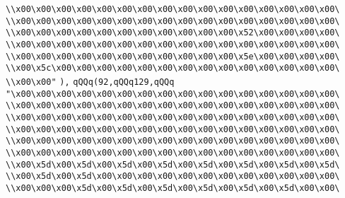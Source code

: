 \verb|\\x00\x00\x00\x00\x00\x00\x00\x00\x00\x00\x00\x00\x00\x00\x00\x00\|\newline
\verb|\\x00\x00\x00\x00\x00\x00\x00\x00\x00\x00\x00\x00\x00\x00\x00\x00\|\newline
\verb|\\x00\x00\x00\x00\x00\x00\x00\x00\x00\x00\x00\x52\x00\x00\x00\x00\|\newline
\verb|\\x00\x00\x00\x00\x00\x00\x00\x00\x00\x00\x00\x00\x00\x00\x00\x00\|\newline
\verb|\\x00\x00\x00\x00\x00\x00\x00\x00\x00\x00\x00\x5e\x00\x00\x00\x00\|\newline
\verb|\\x00\x5c\x00\x00\x00\x00\x00\x00\x00\x00\x00\x00\x00\x00\x00\x00\|\newline
\verb|\\x00\x00"|\newline
\verb|),|\newline
\verb|qQQq(92,qQQq129,qQQq|\newline
\verb|"\x00\x00\x00\x00\x00\x00\x00\x00\x00\x00\x00\x00\x00\x00\x00\x00\|\newline
\verb|\\x00\x00\x00\x00\x00\x00\x00\x00\x00\x00\x00\x00\x00\x00\x00\x00\|\newline
\verb|\\x00\x00\x00\x00\x00\x00\x00\x00\x00\x00\x00\x00\x00\x00\x00\x00\|\newline
\verb|\\x00\x00\x00\x00\x00\x00\x00\x00\x00\x00\x00\x00\x00\x00\x00\x00\|\newline
\verb|\\x00\x00\x00\x00\x00\x00\x00\x00\x00\x00\x00\x00\x00\x00\x00\x00\|\newline
\verb|\\x00\x00\x00\x00\x00\x00\x00\x00\x00\x00\x00\x00\x00\x00\x00\x00\|\newline
\verb|\\x00\x5d\x00\x5d\x00\x5d\x00\x5d\x00\x5d\x00\x5d\x00\x5d\x00\x5d\|\newline
\verb|\\x00\x5d\x00\x5d\x00\x00\x00\x00\x00\x00\x00\x00\x00\x00\x00\x00\|\newline
\verb|\\x00\x00\x00\x5d\x00\x5d\x00\x5d\x00\x5d\x00\x5d\x00\x5d\x00\x00\|\newline
